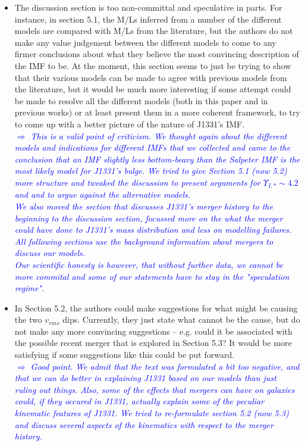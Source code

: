 \documentclass[10pt,a4paper]{article}
\newcommand{\Comment}[1]{\textsl{\textcolor{Blue}{$\Longrightarrow$ {#1}}}}
\begin{document}
\begin{itemize}
\item The discussion section is too non-committal and speculative in parts. For instance,
in section 5.1, the M/Ls inferred from a number of the different models are compared
with M/Ls from the literature, but the authors do not make any value judgement
between the different models to come to any firmer conclusions about what they
believe the most convincing description of the IMF to be. At the moment, this
section seems to just be trying to show that their various models can be made to
agree with previous models from the literature, but it would be much more
interesting if some attempt could be made to resolve all the different models (both
in this paper and in previous works) or at least present them in a more coherent
framework, to try to come up with a better picture of the nature of J1331's IMF. \\\Comment{This is a valid point of criticism. We thought again about the different models and indications for different IMFs that we collected and came to the conclusion that an IMF slightly less bottom-beavy than the Salpeter IMF is the most likely model for J1331's bulge. We tried to give Section 5.1 (now 5.2) more structure and tweaked the discussion to present arguments for $\Upsilon_{I,*} \sim 4.2$ and and to argue against the alternative models.\\We also moved the section that discusses J1331's merger history to the beginning to the discussion section, focussed more on the what the merger could have done to J1331's mass distribution and less on modelling failures. All following sections use the background information about mergers to discuss our models.\\Our scientific honesty is however, that without further data, we cannot be more commital and some of our statements have to stay in the "speculation regime".}

\item In Section 5.2, the authors could make suggestions for what might be causing the two
$v_{rms}$ dips. Currently, they just state what cannot be the cause, but do not make any
more convincing suggestions – e.g. could it be associated with the possible recent
merger that is explored in Section 5.3? It would be more satisfying if some
suggestions like this could be put forward. \\\Comment{Good point. We admit that the text was formulated a bit too negative, and that we can do better in explaining J1331 based on our models than just ruling out things. Also, some of the effects that mergers can have on galaxies \emph{could}, if they occured in J1331, actually explain some of the peculiar kinematic features of J1331. We tried to re-formulate section 5.2 (now 5.3) and discuss several aspects of the kinematics with respect to the merger history.}


\end{itemize}
\end{document}
